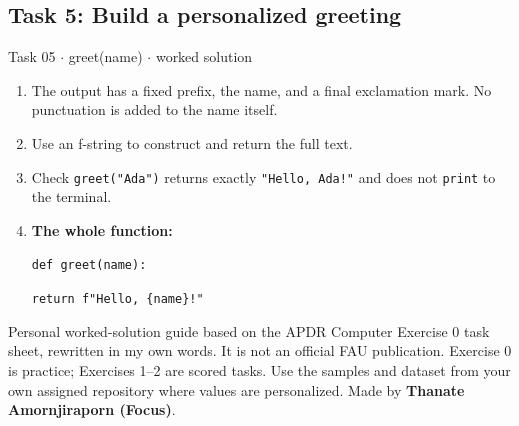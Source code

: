 \documentclass[11pt]{article}
\begin{document}
\begin{keepsection}\subsection{Task 5: Build a personalized greeting}

\begin{workedbox}{Task 05 \ensuremath{\cdot} greet(name) \ensuremath{\cdot} worked solution}
\begin{enumerate}
\item The output has a fixed prefix, the name, and a final exclamation mark. No punctuation is added to the name itself.
\item Use an f-string to construct and return the full text.
\item Check \texttt{greet("Ada")} returns exactly \texttt{"Hello, Ada!"} and does not \texttt{print} to the terminal.
\item {}
\textbf{The whole function:}
\begin{tcolorbox}[colback=Paperblue,colframe=Paperblue,boxrule=0pt,arc=0pt,left=7pt,right=7pt,top=5pt,bottom=5pt]\small\sloppy
\noindent\hspace*{0em}\texttt{def greet(name):}\par
\noindent\hspace*{1em}\texttt{return f"Hello, \{name\}!"}\par
\end{tcolorbox}
\end{enumerate}
\end{workedbox}

\end{keepsection}

\vfill{\small Personal worked-solution guide based on the APDR Computer Exercise 0 task sheet, rewritten in my own words. It is not an official FAU publication. Exercise 0 is practice; Exercises 1–2 are scored tasks. Use the samples and dataset from your own assigned repository where values are personalized. Made by \textbf{Thanate Amornjiraporn (Focus)}.}
\end{document}
